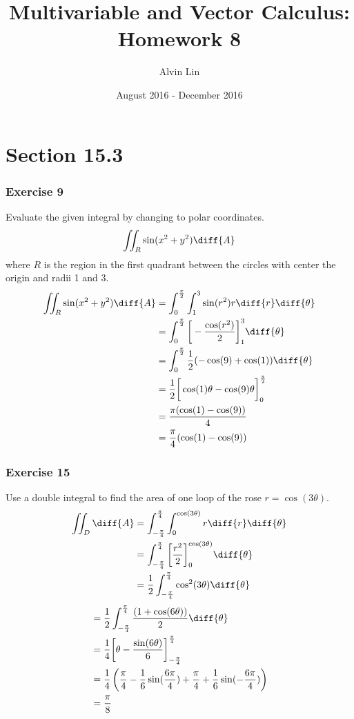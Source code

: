 \documentclass{math}
\title{Multivariable and Vector Calculus: Homework 8}
\author{Alvin Lin}
\date{August 2016 - December 2016}
\begin{document}
\maketitle

\section*{Section 15.3}

\subsubsection*{Exercise 9}
Evaluate the given integral by changing to polar coordinates.
\[ \iint_{R}\sin(x^2+y^2)\diff{A} \]
where \( R \) is the region in the first quadrant between the circles with
center the origin and radii 1 and 3.
\begin{align*}
  \iint_R\sin(x^2+y^2)\diff{A} &=
    \int_{0}^{\frac{\pi}{2}}\int_{1}^{3}\sin(r^2)r\diff{r}\diff{\theta} \\
  &= \int_{0}^{\frac{\pi}{2}}\bigg[-\frac{\cos(r^2)}{2}\bigg]_{1}^{3}
    \diff{\theta} \\
  &= \int_{0}^{\frac{\pi}{2}}\frac{1}{2}(-\cos(9)+\cos(1))\diff{\theta} \\
  &= \frac{1}{2}\bigg[\cos(1)\theta-\cos(9)\theta\bigg]_{0}^{\frac{\pi}{2}} \\
  &= \frac{\pi(\cos(1)-\cos(9))}{4} \\
  &= \frac{\pi}{4}(\cos(1)-\cos(9))
\end{align*}

\subsubsection*{Exercise 15}
Use a double integral to find the area of one loop of the rose
\( r = \cos(3\theta) \).
\begin{align*}
  \iint_{D}\diff{A} &= \int_{-\frac{\pi}{4}}^{\frac{\pi}{4}}
    \int_{0}^{\cos(3\theta)}r\diff{r}\diff{\theta} \\
  &= \int_{-\frac{\pi}{4}}^{\frac{\pi}{4}}
    \bigg[\frac{r^2}{2}\bigg]_{0}^{\cos(3\theta)}\diff{\theta} \\
  &= \frac{1}{2}\int_{-\frac{\pi}{4}}^{\frac{\pi}{4}}
    \cos^2(3\theta)\diff{\theta} \\
\end{align*}
\begin{align*}
  &= \frac{1}{2}\int_{-\frac{\pi}{4}}^{\frac{\pi}{4}}
    \frac{(1+\cos(6\theta))}{2}\diff{\theta} \\
  &= \frac{1}{4}\bigg[
    \theta-\frac{\sin(6\theta)}{6}\bigg]_{-\frac{\pi}{4}}^{\frac{\pi}{4}} \\
  &= \frac{1}{4}\left(\frac{\pi}{4}-\frac{1}{6}\sin(\frac{6\pi}{4})+
    \frac{\pi}{4}+\frac{1}{6}\sin(-\frac{6\pi}{4})\right) \\
  &= \frac{\pi}{8}
\end{align*}
\end{document}
